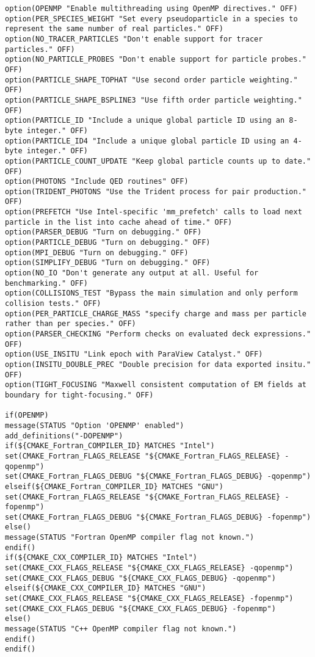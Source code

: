 \begin{lstlisting}[style=FORTRAN, caption=CMakeLists]
option(OPENMP "Enable multithreading using OpenMP directives." OFF)
option(PER_SPECIES_WEIGHT "Set every pseudoparticle in a species to represent the same number of real particles." OFF)
option(NO_TRACER_PARTICLES "Don't enable support for tracer particles." OFF)
option(NO_PARTICLE_PROBES "Don't enable support for particle probes." OFF)
option(PARTICLE_SHAPE_TOPHAT "Use second order particle weighting." OFF)
option(PARTICLE_SHAPE_BSPLINE3 "Use fifth order particle weighting." OFF)
option(PARTICLE_ID "Include a unique global particle ID using an 8-byte integer." OFF)
option(PARTICLE_ID4 "Include a unique global particle ID using an 4-byte integer." OFF)
option(PARTICLE_COUNT_UPDATE "Keep global particle counts up to date." OFF)
option(PHOTONS "Include QED routines" OFF)
option(TRIDENT_PHOTONS "Use the Trident process for pair production." OFF)
option(PREFETCH "Use Intel-specific 'mm_prefetch' calls to load next particle in the list into cache ahead of time." OFF)
option(PARSER_DEBUG "Turn on debugging." OFF)
option(PARTICLE_DEBUG "Turn on debugging." OFF)
option(MPI_DEBUG "Turn on debugging." OFF)
option(SIMPLIFY_DEBUG "Turn on debugging." OFF)
option(NO_IO "Don't generate any output at all. Useful for benchmarking." OFF)
option(COLLISIONS_TEST "Bypass the main simulation and only perform collision tests." OFF)
option(PER_PARTICLE_CHARGE_MASS "specify charge and mass per particle rather than per species." OFF)
option(PARSER_CHECKING "Perform checks on evaluated deck expressions." OFF)
option(USE_INSITU "Link epoch with ParaView Catalyst." OFF)
option(INSITU_DOUBLE_PREC "Double precision for data exported insitu." OFF)
option(TIGHT_FOCUSING "Maxwell consistent computation of EM fields at boundary for tight-focusing." OFF)

if(OPENMP)
message(STATUS "Option 'OPENMP' enabled")
add_definitions("-DOPENMP")
if(${CMAKE_Fortran_COMPILER_ID} MATCHES "Intel")
set(CMAKE_Fortran_FLAGS_RELEASE "${CMAKE_Fortran_FLAGS_RELEASE} -qopenmp")
set(CMAKE_Fortran_FLAGS_DEBUG "${CMAKE_Fortran_FLAGS_DEBUG} -qopenmp")
elseif(${CMAKE_Fortran_COMPILER_ID} MATCHES "GNU")
set(CMAKE_Fortran_FLAGS_RELEASE "${CMAKE_Fortran_FLAGS_RELEASE} -fopenmp")
set(CMAKE_Fortran_FLAGS_DEBUG "${CMAKE_Fortran_FLAGS_DEBUG} -fopenmp")
else()
message(STATUS "Fortran OpenMP compiler flag not known.")
endif()
if(${CMAKE_CXX_COMPILER_ID} MATCHES "Intel")
set(CMAKE_CXX_FLAGS_RELEASE "${CMAKE_CXX_FLAGS_RELEASE} -qopenmp")
set(CMAKE_CXX_FLAGS_DEBUG "${CMAKE_CXX_FLAGS_DEBUG} -qopenmp")
elseif(${CMAKE_CXX_COMPILER_ID} MATCHES "GNU")
set(CMAKE_CXX_FLAGS_RELEASE "${CMAKE_CXX_FLAGS_RELEASE} -fopenmp")
set(CMAKE_CXX_FLAGS_DEBUG "${CMAKE_CXX_FLAGS_DEBUG} -fopenmp")
else()
message(STATUS "C++ OpenMP compiler flag not known.")
endif()
endif()


\end{lstlisting}
